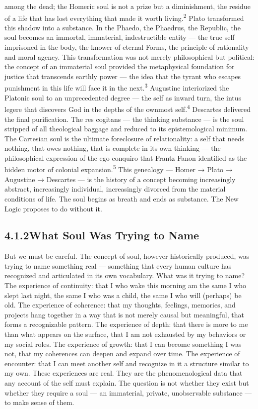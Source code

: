 among the dead; the Homeric soul is not a prize but a diminishment, the residue of a life that has lost everything that made it worth living.\textsuperscript{2} Plato transformed this shadow into a substance. In the Phaedo, the Phaedrus, the Republic, the soul becomes an immortal, immaterial, indestructible entity — the true self imprisoned in the body, the knower of eternal Forms, the principle of rationality and moral agency. This transformation was not merely philosophical but political: the concept of an immaterial soul provided the metaphysical foundation for justice that transcends earthly power — the idea that the tyrant who escapes punishment in this life will face it in the next.\textsuperscript{3} Augustine interiorized the Platonic soul to an unprecedented degree — the self as inward turn, the intus legere that discovers God in the depths of the ownmost self.\textsuperscript{4} Descartes delivered the final purification. The res cogitans — the thinking substance — is the soul stripped of all theological baggage and reduced to its epistemological minimum. The Cartesian soul is the ultimate foreclosure of relationality: a self that needs nothing, that owes nothing, that is complete in its own thinking — the philosophical expression of the ego conquiro that Frantz Fanon identified as the hidden motor of colonial expansion.\textsuperscript{5} This genealogy — Homer → Plato → Augustine → Descartes — is the history of a concept becoming increasingly abstract, increasingly individual, increasingly divorced from the material conditions of life. The soul begins as breath and ends as substance. The New Logic proposes to do without it.

\subsection{4.1.2\quad What Soul Was Trying to Name}

But we must be careful. The concept of soul, however historically produced, was trying to name something real — something that every human culture has recognized and articulated in its own vocabulary. What was it trying to name? The experience of continuity: that I who wake this morning am the same I who slept last night, the same I who was a child, the same I who will (perhaps) be old. The experience of coherence: that my thoughts, feelings, memories, and projects hang together in a way that is not merely causal but meaningful, that forms a recognizable pattern. The experience of depth: that there is more to me than what appears on the surface, that I am not exhausted by my behaviors or my social roles. The experience of growth: that I can become something I was not, that my coherences can deepen and expand over time. The experience of encounter: that I can meet another self and recognize in it a structure similar to my own. These experiences are real. They are the phenomenological data that any account of the self must explain. The question is not whether they exist but whether they require a soul — an immaterial, private, unobservable substance — to make sense of them.

